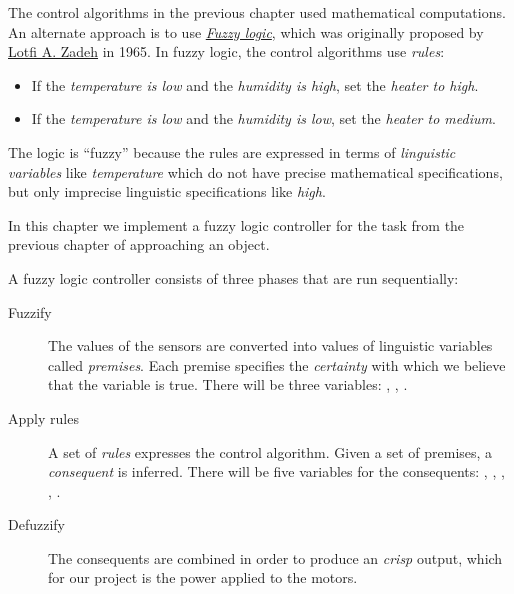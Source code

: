 \label{ch.fuzzy}

The control algorithms in the previous chapter used mathematical
computations. An alternate approach is to use
\href{http://en.wikipedia.org/wiki/Fuzzy_logic}{\emph{Fuzzy logic}}, which was originally proposed by
\href{http://en.wikipedia.org/wiki/Lotfi_A._Zadeh}{Lotfi A. Zadeh} in
1965. In fuzzy logic, the control algorithms use \emph{rules}:

\begin{itemize}
\item If the \emph{temperature is low} and the \emph{humidity is high},
set the \emph{heater to high}.
\item If the \emph{temperature is low} and the \emph{humidity is low},
set the \emph{heater to medium}.
\end{itemize}

The logic is ``fuzzy'' because the rules are expressed in terms of
\emph{linguistic variables} like \emph{temperature} which do not have
precise mathematical specifications, but only imprecise linguistic
specifications like \emph{high}.

In this chapter we implement a fuzzy logic controller for
the task from the previous chapter of approaching an object.



A fuzzy logic controller consists of three phases that are run
 sequentially:

\begin{description}

\item[Fuzzify] The values of the sensors are converted into values of
linguistic variables called \emph{premises}. Each premise specifies the
\emph{certainty} with which we believe that the variable is true. There
will be three variables: , , .

\item[Apply rules] A set of \emph{rules} expresses the control
algorithm. Given a set of premises, a \emph{consequent} is inferred.
There will be five variables for the consequents: ,
, , , .

\item[Defuzzify] The consequents are combined in order to produce an
\emph{crisp} output, which for our project is the power applied to the
motors.

\end{description}

